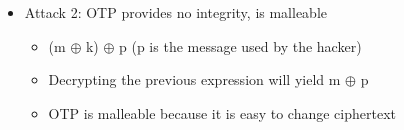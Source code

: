 \documentclass[]{article}
\begin{document}
\begin{itemize}
\begin{itemize}
\begin{itemize}
\begin{itemize}
			\end{itemize}
		\end{itemize}
	\end{itemize}
	\item Attack 2: OTP provides no integrity, is malleable
	\begin{itemize}
		\item (m $\oplus$ k) $\oplus$ p (p is the message used by the hacker)
		\item Decrypting the previous expression will yield m $\oplus$ p
		\item OTP is malleable because it is easy to change ciphertext
	\end{itemize}
\end{itemize}
\end{document}
